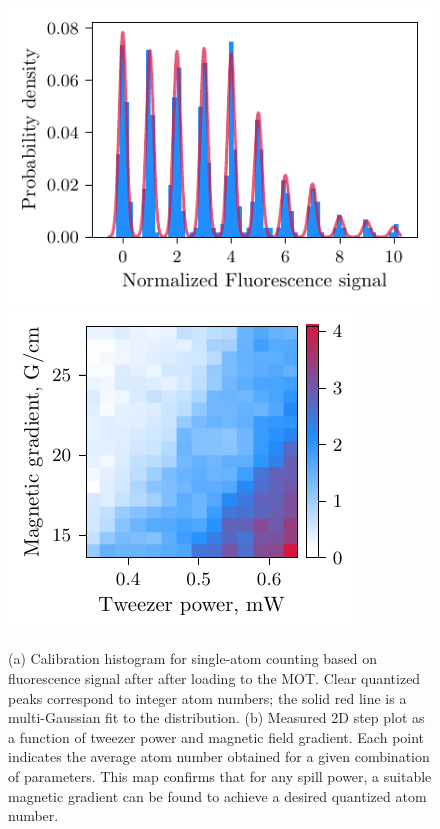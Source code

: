 \begin{figure}[h!]
    \centering
    \includegraphics{fig-py/atom-counting.pdf}
    \phantom{4242}
    \includegraphics{fig-py/step-plot-2d.pdf}
    \caption{
        (a) Calibration histogram for single-atom counting based on fluorescence signal after after loading to the MOT. Clear quantized peaks correspond to integer atom numbers; the solid red line is a multi-Gaussian fit to the distribution. 
        (b) Measured 2D step plot as a function of tweezer power and magnetic field gradient. Each point indicates the average atom number obtained for a given combination of parameters. This map confirms that for any spill power, a suitable magnetic gradient can be found to achieve a desired quantized atom number.
    }
    \label{fig:spillingadd}
\end{figure}

